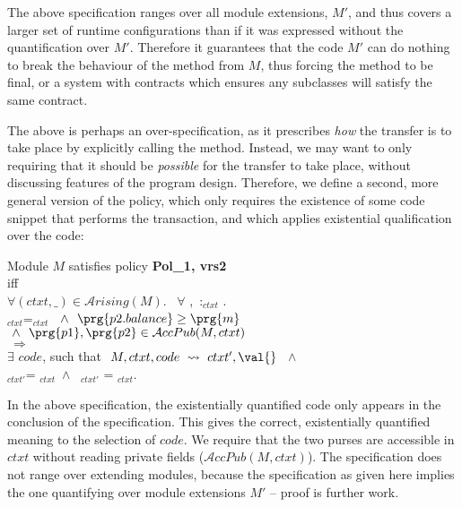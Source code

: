 \noindent
The above specification  ranges over all module extensions, $M'$, and thus covers a larger set  of runtime configurations than if
it was expressed without the quantification over $M'$.
 Therefore it guarantees that the code $M'$ can do nothing to break the behaviour of the  method from $M$, thus forcing the method  to be final, or a system with contracts which ensures any subclasses will satisfy the same contract.
 
The above is perhaps an over-specification, as it prescribes {\em how}
the transfer is to take place by explicitly calling the
    method. Instead, we may want to only requiring
that it should be {\em possible} for the transfer to take place,
 without discussing features of the program design. Therefore, we define a
second, more general version of the policy, which  only requires the existence of some
  code snippet   that performs the transaction, and which applies existential qualification over the code:
\begin{shaded}
\begin{center}
Module $M$ satisfies policy {\bf Pol\_1, vrs2} \\ iff
\\
$\forall  (ctxt,\_)\in{\mathcal A}rising(M)$. \ $\forall$ %
, \,:$_{ctxt}$ .
\\
 $_{ctxt}$=$_{ctxt}\ $      $\ \wedge \  \  \prg{p2.balance}\geq \prg{m}$
 $\ \wedge \  \ \prg{p1},\prg{p2}\in {\mathcal A}ccPub(M, ctxt)$\\
 $ \ \Rightarrow\ $\\
$\exists$ $code$, such that
$\  M,  ctxt, code \ \leadsto \ ctxt', \val{}$  $\ \wedge \  $\\
$_{ctxt'}$= $_{ctxt}$\ $ \wedge$ \ $_{ctxt'}$ = $_{ctxt}$.
 \end{center}
\end{shaded}
\noindent
In the above specification, the existentially quantified code only appears in the conclusion of the specification. This  gives the correct, existentially quantified meaning to the selection of $code$. We require that the two purses are accessible in $ctxt$ without reading private fields (${\mathcal A}ccPub(M, ctxt)$). The specification does not range over extending modules, because the specification as given here implies the one  quantifying over module extensions $M'$ --  proof is further work.


